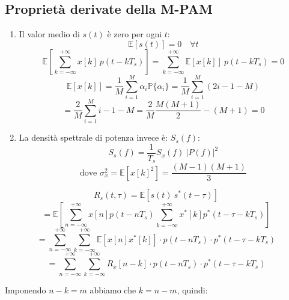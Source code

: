 \subsection*{Proprietà derivate della M-PAM}
\begin{enumerate}
    \item Il valor medio di \( s(t) \) è zero per ogni \( t \):
          \begin{equation*}
              \mathbb{E}\left[ s(t) \right] = 0 \quad \forall t
          \end{equation*}
          \begin{equation*}
              \mathbb{E} \left[ \sum_{k=-\infty}^{+\infty} x[k] \ p(t-kT_s) \right] = \sum_{k=-\infty}^{+\infty} \mathbb{E}\left[x[k]\right]\ p(t-kT_s) = 0
          \end{equation*}
          \begin{equation*}
              \mathbb{E}\left[x[k]\right] = \frac{1}{M} \sum_{i=1}^{M} \alpha_i \mathbb{P}\{\alpha_i\} = \frac{1}{M} \sum_{i=1}^{M} (2i - 1 - M)
          \end{equation*}
          \begin{equation*}
              = \frac{2}{M} \sum_{i=1}^{M} i - 1 - M = \frac{2}{M} \frac{M(M+1)}{2} - (M+1) = 0
          \end{equation*}

    \item La densità spettrale di potenza invece è: \( S_s(f) \):
          \begin{equation*}
              S_s(f) = \frac{1}{T_s} S_x(f) \ |P(f)|^2
          \end{equation*}
          \begin{equation*}
              \text{dove } \sigma_x^2 = \mathbb{E}\left[ x\left[k\right]^2 \right] = \frac{(M-1)(M+1)}{3}
          \end{equation*}
\end{enumerate}

\[
    R_s(t,\tau) = \mathbb{E}[s(t) \ s^*(t-\tau)]
\]
\[
    = \mathbb{E} \left[ \sum_{n=-\infty}^{+\infty} x\left[n\right] p(t - nT_s) \sum_{k=-\infty}^{+\infty} x^*\left[k\right] p^*(t - \tau - kT_s) \right]
\]
\[
    = \sum_{n=-\infty}^{+\infty} \sum_{k=-\infty}^{+\infty} \mathbb{E}[x\left[n\right] x^*\left[k\right]] \cdot p(t - nT_s) \cdot p^*(t - \tau - kT_s)
\]
\[
    = \sum_{n=-\infty}^{+\infty} \sum_{k=-\infty}^{+\infty} R_x\left[n-k\right] \cdot p(t - nT_s) \cdot p^*(t - \tau - kT_s)
\]

Imponendo \( n-k = m \) abbiamo che \( k = n-m \), quindi:

